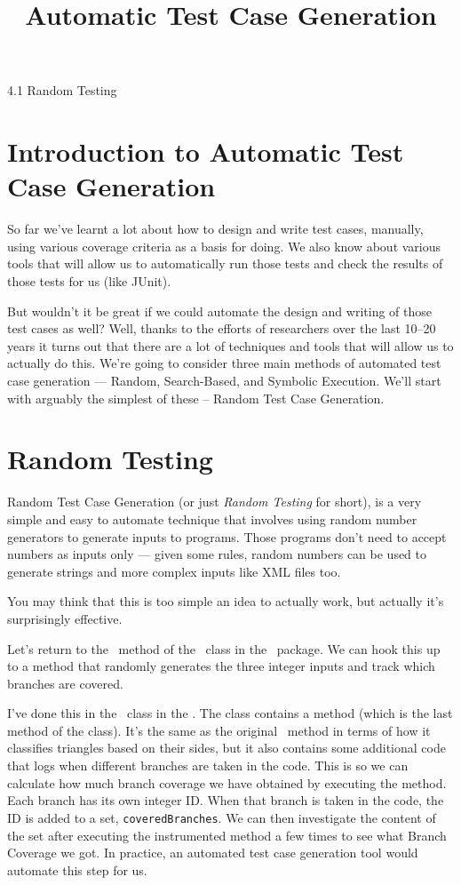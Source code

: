 



\title{Automatic Test Case Generation}{4.1 Random Testing}

\section{Introduction to Automatic Test Case Generation}

So far we've learnt a lot about how to design and write test cases, manually, using
various coverage criteria as a basis for doing. We also know about various tools
that will allow us to automatically run those tests and check the results of
those tests for us (like JUnit). 

But wouldn't it be great if we could automate the design and writing of those
test cases as well? Well, thanks to the efforts of researchers over the last
10--20 years it turns out that there are a lot of techniques and tools that will
allow us to actually do this. We're going to consider three main methods of
automated test case generation --- Random, Search-Based, and Symbolic Execution.
We'll start with arguably the simplest of these -- Random Test Case Generation.


\section{Random Testing}

Random Test Case Generation (or just {\it Random Testing} for short), is a very
simple and easy to automate technique that involves using random number
generators to generate inputs to programs. Those programs don't need to accept
numbers as inputs only --- given some rules, random numbers can be used to
generate strings and more complex inputs like XML files too.

You may think that this is too simple an idea to actually work, but actually
it's surprisingly effective. 


Let's return to the \classifymethod~method of the \triangleclass~class in the
\lecturespackage~package. We can hook this up to a method that randomly
generates the three integer inputs and track which branches are covered. 

I've done this in the \randomlytesttriangleclass~class in the
\lecturesexecutionpackage. The class contains a method
\instrumentedclassifymethod (which is the last method of the class). It's the
same as the original \classifymethod~method in terms of how it classifies
triangles based on their sides, but it also contains some additional code that
logs when different branches are taken in the code. This is so we can calculate
how much branch coverage we have obtained by executing the method. Each branch
has its own integer ID. When that branch is taken in the code, the ID is added
to a set, {\tt coveredBranches}. We can then investigate the content of the set
after executing the instrumented method a few times to see what Branch Coverage
we got. In practice, an automated test case generation tool would automate this
step for us.

